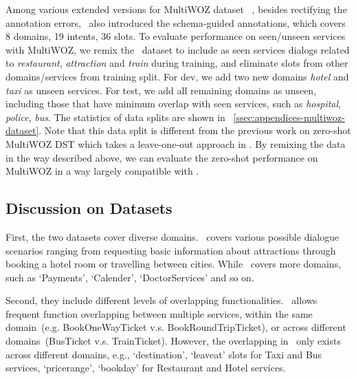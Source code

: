 Among various extended versions for MultiWOZ
dataset~\cite[2.0-2.3,][]{budzianowski2018multiwoz,
  eric2020multiwoz,zang-etal-2020-multiwoz,han2020multiwoz} , besides
rectifying the annotation errors, \multiwoz ~also introduced the
schema-guided annotations, which covers 8 domains, 19 intents, 36
slots.  To evaluate performance on seen/unseen services with MultiWOZ,
we remix the \multiwoz~dataset to include as seen services dialogs
related to \textit{restaurant}, \textit{attraction} and \textit{train}
during training, and eliminate slots from other domains/services from
training split.  For dev, we add two new domains {\it hotel} and {\it
  taxi} as unseen services. For test, we add all remaining domains as
unseen, including those that have minimum overlap with seen services,
such as {\it hospital}, {\it police}, {\it bus}. The statistics of
data splits are shown in
~\autoref{ssec:appendices-multiwoz-dataset}. Note that this data split
is different from the previous work on zero-shot MultiWOZ DST which
takes a leave-one-out approach in \citet{wu2019transferable}. By
remixing the data in the way described above, we can evaluate the
zero-shot performance on MultiWOZ in a way largely compatible with
\sgdst.

\subsection{Discussion on Datasets}
\label{ssec:sgd:discussion-datasets}

First, the two datasets cover diverse domains. \multiwoz~covers
various possible dialogue scenarios ranging from requesting basic
information about attractions through booking a hotel room or
travelling between cities. While \sgdst~covers more domains, such as
`Payments', `Calender', `DoctorServices' and so on.

Second, they include different levels of overlapping
functionalities. \sgdst~allows frequent function overlapping between
multiple services, within the same domain~(e.g. BookOneWayTicket
v.s. BookRoundTripTicket), or across different domains~(BusTicket
v.s. TrainTicket). However, the overlapping in \multiwoz~only exists
across different domains, e.g., `destination', `leaveat' slots for
Taxi and Bus services, `pricerange', `bookday' for Restaurant and
Hotel services.

